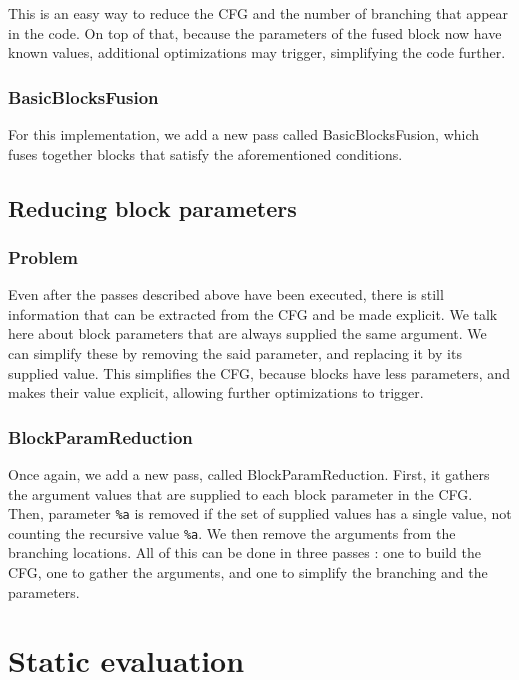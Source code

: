 \documentclass[12pt,a4paper]{article}
\newcommand{\scala}[1]{\textsf{#1}}
\newcommand{\nir}[1]{\texttt{#1}}
\begin{document}
This is an easy way to reduce the CFG and the number of branching that appear in the code. On top of that, because the parameters of the fused block now have known values, additional optimizations may trigger, simplifying the code further.

\subsubsection*{BasicBlocksFusion}

For this implementation, we add a new pass called \scala{BasicBlocksFusion}, which fuses together blocks that satisfy the aforementioned conditions.

\subsection{Reducing block parameters}

\subsubsection*{Problem}

Even after the passes described above have been executed, there is still information that can be extracted from the CFG and be made explicit. We talk here about block parameters that are always supplied the same argument. We can simplify these by removing the said parameter, and replacing it by its supplied value. This simplifies the CFG, because blocks have less parameters, and makes their value explicit, allowing further optimizations to trigger.

\subsubsection*{BlockParamReduction}

Once again, we add a new pass, called \scala{BlockParamReduction}. First, it gathers the argument values that are supplied to each block parameter in the CFG. Then, parameter \nir{\%a} is removed if the set of supplied values has a single value, not counting the recursive value \nir{\%a}. We then remove the arguments from the branching locations. All of this can be done in three passes : one to build the CFG, one to gather the arguments, and one to simplify the branching and the parameters.

\section{Static evaluation}
\end{document}
